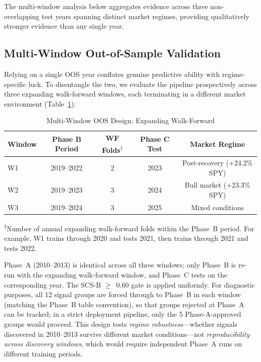 \documentclass[12pt,a4paper]{article}
\begin{document}
The multi-window analysis below aggregates evidence across three non-overlapping test years spanning distinct market regimes, providing qualitatively stronger evidence than any single year.

\subsection{Multi-Window Out-of-Sample Validation}
\label{sec:multiwindow}

Relying on a single OOS year conflates genuine predictive ability with regime-specific luck. To disentangle the two, we evaluate the pipeline prospectively across three expanding walk-forward windows, each terminating in a different market environment (Table~\ref{tab:multiwindow_design}):

\begin{table}[H]
\centering
\caption{Multi-Window OOS Design: Expanding Walk-Forward}
\label{tab:multiwindow_design}
\small
\begin{tabular}{lcccc}
\toprule
Window & Phase B Period & WF Folds\textsuperscript{$\dagger$} & Phase C Test & Market Regime \\
\midrule
W1 & 2019--2022 & 2 & 2023 & Post-recovery (+24.2\% SPY) \\
W2 & 2019--2023 & 3 & 2024 & Bull market (+23.3\% SPY) \\
W3 & 2019--2024 & 3 & 2025 & Mixed conditions \\
\bottomrule
\end{tabular}
\smallskip

\footnotesize{\textsuperscript{$\dagger$}Number of annual expanding walk-forward folds within the Phase~B period. For example, W1 trains through 2020 and tests 2021, then trains through 2021 and tests 2022.}
\end{table}

Phase~A (2010--2013) is identical across all three windows; only Phase~B is re-run with the expanding walk-forward window, and Phase~C tests on the corresponding year. The SCS-B $\geq$~0.60 gate is applied uniformly. For diagnostic purposes, all 12 signal groups are forced through to Phase~B in each window (matching the Phase~B table convention), so that groups rejected at Phase~A can be tracked; in a strict deployment pipeline, only the 5 Phase-A-approved groups would proceed. This design tests \emph{regime robustness}---whether signals discovered in 2010--2013 survive different market conditions---not \emph{reproducibility across discovery windows}, which would require independent Phase~A runs on different training periods.
\end{document}
